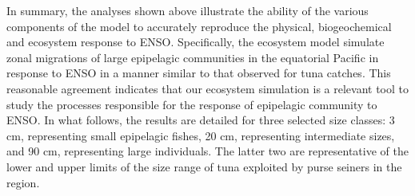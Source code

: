 In summary, the analyses shown above illustrate the ability of the various components of the model to accurately reproduce the physical, biogeochemical and ecosystem response to ENSO. Specifically, the ecosystem model simulate zonal migrations of large epipelagic communities in the equatorial Pacific in response to ENSO in a manner similar to that observed for tuna catches. This reasonable agreement indicates that our ecosystem simulation is a relevant tool to study the processes responsible for the response of epipelagic community to ENSO. In what follows, the results are detailed for three selected size classes: 3 cm, representing small epipelagic fishes, 20 cm, representing intermediate sizes, and 90 cm, representing large individuals. The latter two are representative of the lower and upper limits of the size range of tuna exploited by purse seiners in the region.

\clearpage